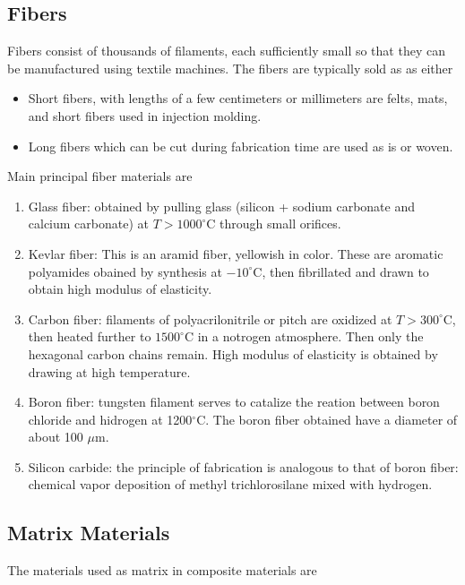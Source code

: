 \documentclass[
10pt,
a4paper,
openany,
svgnames,
]{book}
\begin{document}
\subsection{Fibers}

Fibers consist of thousands of filaments, each sufficiently small so that they can be manufactured using textile machines. The fibers are typically sold as as either

\begin{itemize}
\item Short fibers, with lengths of a few centimeters or millimeters are felts, mats, and short fibers used in injection molding.
\item Long fibers which can be cut during fabrication time are used as is or woven.
\end{itemize}

Main principal fiber materials are

\begin{enumerate}
\item Glass fiber: obtained by pulling glass (silicon + sodium carbonate and calcium carbonate) at $T > 1000^{\circ}$C through small orifices.
\item Kevlar fiber: This is an aramid fiber, yellowish in color. These are aromatic polyamides obained by synthesis at $-10^{\circ}$C, then fibrillated and drawn to obtain high modulus of elasticity.
\item Carbon fiber: filaments of polyacrilonitrile or pitch are oxidized at $T > 300^{\circ}$C, then heated further to $1500^{\circ}$C in a notrogen atmosphere. Then only the hexagonal carbon chains remain. High modulus of elasticity is obtained by drawing at high temperature.
\item Boron fiber: tungsten filament serves to catalize the reation between boron chloride and hidrogen at 1200$^{\circ}$C. The boron fiber obtained have a diameter of about 100 $\mu$m.
\item Silicon carbide: the principle of fabrication is analogous to that of boron fiber: chemical vapor deposition of methyl trichlorosilane mixed with hydrogen.
\end{enumerate}

\subsection{Matrix Materials}

The materials used as matrix in composite materials are
\end{document}
